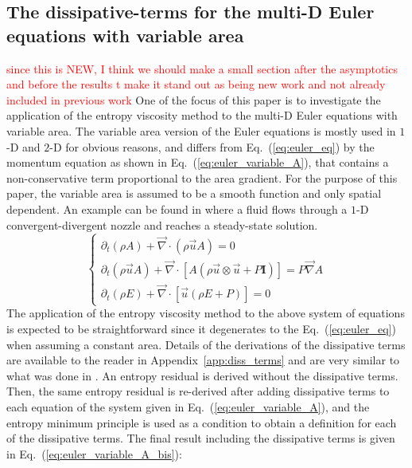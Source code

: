 \documentclass[preprint,10pt]{elsarticle}
\renewcommand{\div}{\vec{\nabla}\! \cdot \!}
\newcommand{\grad}{\vec{\nabla}}
\newcommand{\eqt}[1]{Eq.~(\ref{#1})}                     %
\newcommand{\app}[1]{Appendix~\ref{#1}}                   %
\newcommand{\tcr}[1]{\textcolor{red}{#1}}
\begin{document}
\subsection{The dissipative-terms for the multi-D Euler equations with variable area} 
\tcr{since this is NEW, I think we should make a small section after the asymptotics and before the results t make it stand out as being new work and not already included in previous work}
One of the focus of this paper is to investigate the application of the entropy viscosity method to the multi-D Euler equations with variable area. The variable area version of the Euler equations is mostly used in $1$-D and $2$-D for obvious reasons, and differs from \eqt{eq:euler_eq} by the momentum equation as shown in \eqt{eq:euler_variable_A}, that contains a non-conservative term proportional to the area gradient. For the purpose of this paper, the variable area is assumed to be a smooth function and only spatial dependent. An example can be found in \cite{SEM} where a fluid flows through a $1$-D convergent-divergent nozzle and reaches a steady-state solution.
\begin{equation}
\label{eq:euler_variable_A}
\left\{ 
\begin{array}{lll}
\partial_t \left( \rho A \right) + \div \left( \rho \vec{u} A \right) = 0 \\
\partial_t \left( \rho \vec{u} A \right) + \div \left[A\left( \rho \vec{u} \otimes \vec{u} + P \mathbf{I} \right) \right] = P \grad A \\
\partial_t \left( \rho E \right) + \div \left[ \vec{u} \left( \rho E + P \right) \right] = 0
\end{array}
\right.
\end{equation}
The application of the entropy viscosity method to the above system of equations is expected to be straightforward since it degenerates to the \eqt{eq:euler_eq} when assuming a constant area. Details of the derivations of the dissipative terms are available to the reader in \app{app:diss_terms} and are very similar to what was done in \cite{jlg}. An entropy residual is derived without the dissipative terms. Then, the same entropy residual is re-derived after adding dissipative terms to each equation of the system given in \eqt{eq:euler_variable_A}, and the entropy minimum principle is used as a condition to obtain a definition for each of the dissipative terms. The final result including the dissipative terms is given in \eqt{eq:euler_variable_A_bis}:
\end{document}
